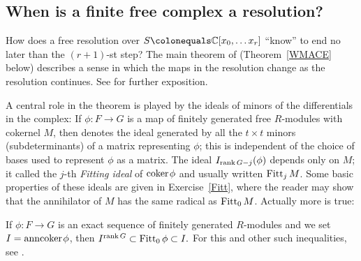 
\subsection*{When is a finite free complex a resolution?}
How does a free resolution over $S \colonequals  \CC[x_0, \dots x_r]$
``know'' to end no later than the $(r+1)$-st step?
The main theorem of \cite{WMACE} (Theorem~\ref{WMACE} below)
describes a sense in which the maps in the resolution
change as the resolution continues. See \cite[Theorem 20.9]{Eisenbud1995}
for further exposition.

A central role in the theorem is played by the ideals of minors of the
differentials in the complex: If $\phi: F\to G$ is a map of finitely
generated free $R$-modules with cokernel $M$, then
denotes the ideal generated by all the $t\times t$ minors
(subdeterminants) of a matrix representing $\phi$; this is independent
of the choice of bases used to represent $\phi$ as a matrix.
The ideal $I_{\operatorname{rank} G -j}(\phi)$ depends only on $M$; it called the
$j$-th \emph{Fitting ideal} of ${\rm{coker}\kern1pt} \phi$  and
%
%
usually written $\operatorname{Fitt}_{j} M$. Some basic properties of these ideals are
given in Exercise~\ref{Fitt}, where the reader may show that the
annihilator of $M$ has the
same radical as $\operatorname{Fitt}_{0} M$. Actually more is true:

\begin{fact}
If $\phi: F\to G$ is an exact sequence of finitely generated
$R$-modules and we set $I = {\rm{ann}}{\rm{coker}\kern1pt} \phi$, then
$
I^{\operatorname{rank} G}\subset \operatorname{Fitt}_{0}\phi \subset
I.
$
For this and other such inequalities, see \cite{MR476736}.
\end{fact}

